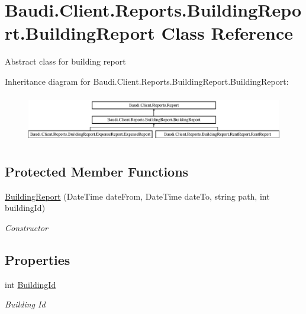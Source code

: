\hypertarget{class_baudi_1_1_client_1_1_reports_1_1_building_report_1_1_building_report}{}\section{Baudi.\+Client.\+Reports.\+Building\+Report.\+Building\+Report Class Reference}
\label{class_baudi_1_1_client_1_1_reports_1_1_building_report_1_1_building_report}


Abstract class for building report  


Inheritance diagram for Baudi.\+Client.\+Reports.\+Building\+Report.\+Building\+Report\+:\begin{figure}[H]
\begin{center}
\leavevmode
\includegraphics[height=2.105263cm]{class_baudi_1_1_client_1_1_reports_1_1_building_report_1_1_building_report}
\end{center}
\end{figure}
\subsection*{Protected Member Functions}
\begin{DoxyCompactItemize}
\item 
\hyperlink{class_baudi_1_1_client_1_1_reports_1_1_building_report_1_1_building_report_a5cc6a011ed82ea79bb4015c457285e1b}{Building\+Report} (Date\+Time date\+From, Date\+Time date\+To, string path, int building\+Id)
\begin{DoxyCompactList}\small\item\em Constructor \end{DoxyCompactList}\end{DoxyCompactItemize}
\subsection*{Properties}
\begin{DoxyCompactItemize}
\item 
int \hyperlink{class_baudi_1_1_client_1_1_reports_1_1_building_report_1_1_building_report_a064a73af91e02fb3420e9ee5b56e49d4}{Building\+Id}
\begin{DoxyCompactList}\small\item\em Building Id \end{DoxyCompactList}\end{DoxyCompactItemize}
